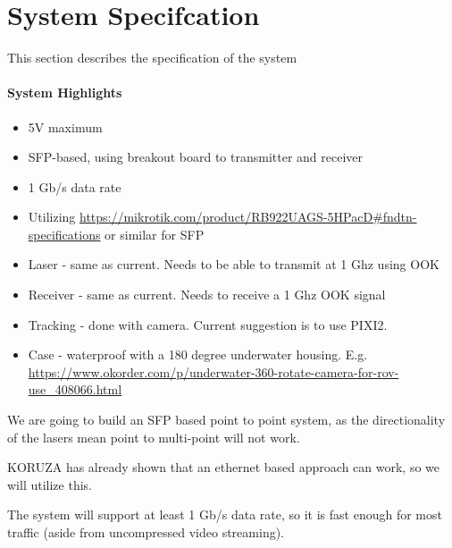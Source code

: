 \section{System Specifcation}
This section describes the specification of the system

\paragraph{\textbf{System Highlights}}
\begin{itemize}
\item{5V maximum}
\item{\ac{SFP}-based, using breakout board to transmitter and receiver}
\item{1 Gb/s data rate}
\item{Utilizing
	\url{https://mikrotik.com/product/RB922UAGS-5HPacD#fndtn-specifications}
	or similar for SFP}
\item{Laser - same as current. Needs to be able to transmit at 1 Ghz using
	\ac{OOK}}
\item{Receiver - same as current. Needs to receive a 1 Ghz \ac{OOK} signal}
\item{Tracking - done with camera. Current suggestion is to use PIXI2.}
\item{Case - waterproof with a 180 degree underwater housing. E.g.
	\url{https://www.okorder.com/p/underwater-360-rotate-camera-for-rov-use_408066.html}}
\end{itemize}

We are going to build an \ac{SFP} based point to point system, as the
directionality of the lasers mean point to multi-point will not work.

KORUZA has already shown that an ethernet based approach can work, so we will
utilize this.

The system will support at least 1 Gb/s data rate, so it is fast enough
for most traffic (aside from uncompressed video streaming).
